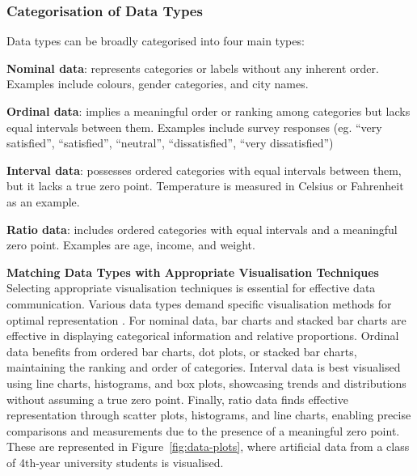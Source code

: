 \documentclass{article}\usepackage[]{graphicx}\usepackage[]{xcolor}
\numberwithin{equation}{section}
\begin{document}
\subsubsection{Categorisation of Data Types}
Data types can be broadly categorised into four main types: 
\begin{itemise}
    \item \textbf{Nominal data}: represents categories or labels without any inherent order. Examples include colours, gender categories, and city names. 
    \item \textbf{Ordinal data}: implies a meaningful order or ranking among categories but lacks equal intervals between them. Examples include survey responses (eg. “very satisfied”, “satisfied”, “neutral”, “dissatisfied”, “very dissatisfied”)
    \item \textbf{Interval data}: possesses ordered categories with equal intervals between them, but it lacks a true zero point. Temperature is measured in Celsius or Fahrenheit as an example. 
    \item \textbf{Ratio data}: includes ordered categories with equal intervals and a meaningful zero point. Examples are age, income, and weight. 
\end{itemise}

\noindent \textbf{Matching Data Types with Appropriate Visualisation Techniques}\\
\noindent Selecting appropriate visualisation techniques is essential for effective data communication. Various data types demand specific visualisation methods for optimal representation \cite{healy2018data}. For nominal data, bar charts and stacked bar charts are effective in displaying categorical information and relative proportions. Ordinal data benefits from ordered bar charts, dot plots, or stacked bar charts, maintaining the ranking and order of categories. Interval data is best visualised using line charts, histograms, and box plots, showcasing trends and distributions without assuming a true zero point. Finally, ratio data finds effective representation through scatter plots, histograms, and line charts, enabling precise comparisons and measurements due to the presence of a meaningful zero point. These are represented in Figure~\ref{fig:data-plots}, where artificial data from a class of 4th-year university students is visualised.
\end{document}
